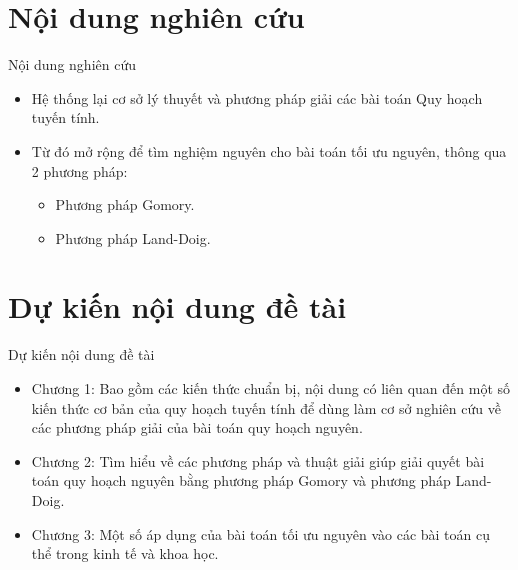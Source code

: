 \documentclass{beamer}
\begin{document}
\section{Nội dung nghiên cứu}
\begin{frame}{Nội dung nghiên cứu}
    \begin{itemize}
    \item Hệ thống lại cơ sở lý thuyết và phương pháp giải các bài toán Quy hoạch tuyến tính.
    \item Từ đó mở rộng để tìm nghiệm nguyên cho bài toán tối ưu nguyên, thông qua 2 phương pháp:
    \begin{itemize}
    \item Phương pháp Gomory.
    \item Phương pháp Land-Doig.
    \end{itemize}
    \end{itemize}
\end{frame}
\section{Dự kiến nội dung đề tài}
\begin{frame}{Dự kiến nội dung đề tài}
    \begin{itemize}
    \item Chương 1:  Bao gồm các kiến thức chuẩn bị, nội dung có liên quan đến
    một số kiến thức cơ bản của quy hoạch tuyến tính để dùng
    làm cơ sở nghiên cứu về các phương pháp giải của bài toán quy hoạch nguyên.
    \item Chương 2: Tìm hiểu về các phương pháp và thuật giải giúp giải quyết bài toán quy hoạch nguyên bằng phương pháp Gomory và phương pháp Land-Doig.
    \item Chương 3: Một số áp dụng của bài toán tối ưu nguyên vào các bài toán cụ thể trong kinh tế và khoa học.
    \end{itemize}   
\end{frame}
\end{document}

